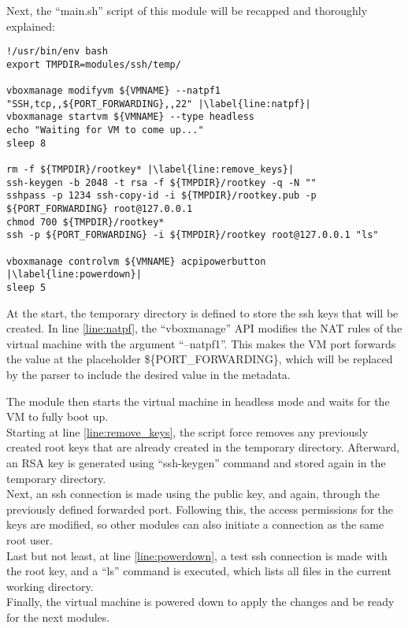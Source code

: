 Next, the “main.sh” script of this module will be recapped and thoroughly explained:


\clearpage

\begin{lstlisting}[caption=ssh main.sh, style=pythonstyle, escapechar=|]
!/usr/bin/env bash
export TMPDIR=modules/ssh/temp/

vboxmanage modifyvm ${VMNAME} --natpf1 "SSH,tcp,,${PORT_FORWARDING},,22" |\label{line:natpf}|
vboxmanage startvm ${VMNAME} --type headless
echo "Waiting for VM to come up..."
sleep 8

rm -f ${TMPDIR}/rootkey* |\label{line:remove_keys}|
ssh-keygen -b 2048 -t rsa -f ${TMPDIR}/rootkey -q -N ""
sshpass -p 1234 ssh-copy-id -i ${TMPDIR}/rootkey.pub -p ${PORT_FORWARDING} root@127.0.0.1
chmod 700 ${TMPDIR}/rootkey*
ssh -p ${PORT_FORWARDING} -i ${TMPDIR}/rootkey root@127.0.0.1 "ls"

vboxmanage controlvm ${VMNAME} acpipowerbutton |\label{line:powerdown}|
sleep 5
\end{lstlisting}

At the start, the temporary directory is defined to store the ssh keys that will be created.
In line \ref{line:natpf}, the “vboxmanage” API modifies the NAT rules of the virtual machine with the argument “--natpf1”. This makes the VM port forwards the value at the placeholder \$\{PORT\_FORWARDING\}, which will be replaced by the parser to include the desired value in the metadata.

The module then starts the virtual machine in headless mode and waits for the VM to fully boot up.\\
Starting at line \ref{line:remove_keys}, the script force removes any previously created root keys that are already created in the temporary directory. Afterward, an RSA key is generated using “ssh-keygen” command and stored again in the temporary directory.\\
Next, an ssh connection is made using the public key, and again, through the previously defined forwarded port. Following this, the access permissions for the keys are modified, so other modules can also initiate a connection as the same root user.\\
Last but not least, at line \ref{line:powerdown}, a test ssh connection is made with the root key, and a “ls” command is executed, which lists all files in the current working directory.\\
Finally, the virtual machine is powered down to apply the changes and be ready for the next modules.


